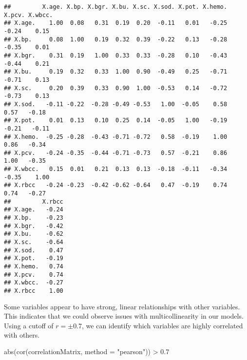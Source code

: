 \documentclass[
]{article}
\newenvironment{Shaded}{\begin{snugshade}}{\end{snugshade}}
\newcommand{\AttributeTok}[1]{\textcolor[rgb]{0.77,0.63,0.00}{#1}}
\newcommand{\FloatTok}[1]{\textcolor[rgb]{0.00,0.00,0.81}{#1}}
\newcommand{\FunctionTok}[1]{\textcolor[rgb]{0.00,0.00,0.00}{#1}}
\newcommand{\NormalTok}[1]{#1}
\newcommand{\SpecialCharTok}[1]{\textcolor[rgb]{0.00,0.00,0.00}{#1}}
\newcommand{\StringTok}[1]{\textcolor[rgb]{0.31,0.60,0.02}{#1}}
\begin{document}
\begin{verbatim}
##         X.age. X.bp. X.bgr. X.bu. X.sc. X.sod. X.pot. X.hemo. X.pcv. X.wbcc.
## X.age.    1.00  0.08   0.31  0.19  0.20  -0.11   0.01   -0.25  -0.24    0.15
## X.bp.     0.08  1.00   0.19  0.32  0.39  -0.22   0.13   -0.28  -0.35    0.01
## X.bgr.    0.31  0.19   1.00  0.33  0.33  -0.28   0.10   -0.43  -0.44    0.21
## X.bu.     0.19  0.32   0.33  1.00  0.90  -0.49   0.25   -0.71  -0.71    0.13
## X.sc.     0.20  0.39   0.33  0.90  1.00  -0.53   0.14   -0.72  -0.73    0.13
## X.sod.   -0.11 -0.22  -0.28 -0.49 -0.53   1.00  -0.05    0.58   0.57   -0.18
## X.pot.    0.01  0.13   0.10  0.25  0.14  -0.05   1.00   -0.19  -0.21   -0.11
## X.hemo.  -0.25 -0.28  -0.43 -0.71 -0.72   0.58  -0.19    1.00   0.86   -0.34
## X.pcv.   -0.24 -0.35  -0.44 -0.71 -0.73   0.57  -0.21    0.86   1.00   -0.35
## X.wbcc.   0.15  0.01   0.21  0.13  0.13  -0.18  -0.11   -0.34  -0.35    1.00
## X.rbcc   -0.24 -0.23  -0.42 -0.62 -0.64   0.47  -0.19    0.74   0.74   -0.27
##         X.rbcc
## X.age.   -0.24
## X.bp.    -0.23
## X.bgr.   -0.42
## X.bu.    -0.62
## X.sc.    -0.64
## X.sod.    0.47
## X.pot.   -0.19
## X.hemo.   0.74
## X.pcv.    0.74
## X.wbcc.  -0.27
## X.rbcc    1.00
\end{verbatim}

Some variables appear to have strong, linear relationships with other
variables. This indicates that we could observe issues with
multicollinearity in our models. Using a cutoff of \(r = \pm 0.7\), we
can identify which variables are highly correlated with others.

\begin{Shaded}
\begin{Highlighting}[]
\FunctionTok{abs}\NormalTok{(}\FunctionTok{cor}\NormalTok{(correlationMatrix, }\AttributeTok{method =} \StringTok{"pearson"}\NormalTok{)) }\SpecialCharTok{\textgreater{}} \FloatTok{0.7}
\end{Highlighting}
\end{Shaded}
\end{document}
